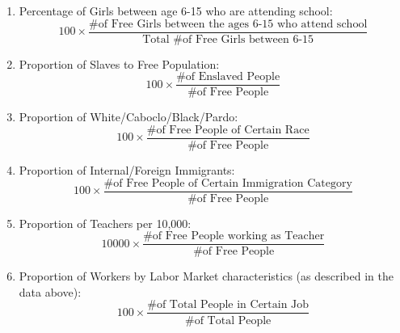 \documentclass{article}
\begin{document}
\begin{enumerate}
  \item Percentage of Girls between age 6-15 who are attending school:
  \begin{equation*}
    100 \times \frac{\text{\# of Free Girls between the ages 6-15 who attend school}}{\text{Total \# of Free Girls between 6-15}}
  \end{equation*}

  \item Proportion of Slaves to Free Population:
  $$ 100 \times \frac{\text{\# of Enslaved People}}{\text{\# of Free People}} $$

  \item Proportion of White/Caboclo/Black/Pardo:
  $$ 100 \times \frac{\text{\# of Free People of Certain Race}}{\text{\# of Free People}}$$

  \item Proportion of Internal/Foreign Immigrants:
  $$ 100 \times \frac{\text{\# of Free People of Certain Immigration Category}}{\text{\# of Free People}}$$
  \item Proportion of Teachers per 10,000:
  $$ 10000 \times \frac{\text{\# of Free People working as Teacher}}{\text{\# of Free People}}$$
  \item Proportion of Workers by Labor Market characteristics (as described in the data above):
  $$ 100 \times \frac{\text{\# of Total People in Certain Job}}{\text{\# of Total People}}$$
\end{enumerate}
\end{document}
